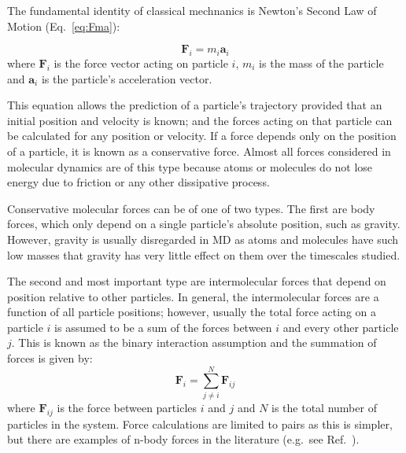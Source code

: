 \documentclass[12pt]{UoAthesis} \usepackage{booktabs}
\begin{document}
The fundamental identity of classical mechnanics is Newton's Second
Law of Motion (Eq.~\eqref{eq:Fma}):

\begin{equation}
  \mathbf{F}_i = m_i\mathbf{a}_i
  \label{eq:Fma} 
\end{equation}
%
%
%
where $\mathbf{F}_i$ is the force vector acting on particle $i$, $m_i$
is the mass of the particle and $\mathbf{a}_i$ is the particle's
acceleration vector.

This equation allows the prediction of a particle's trajectory
provided that an initial position and velocity is known; and the
forces acting on that particle can be calculated for any position or
velocity.  If a force depends only on the position of a particle, it
is known as a conservative force. Almost all forces considered in
molecular dynamics are of this type because atoms or molecules do not
lose energy due to friction or any other dissipative process.

Conservative molecular forces can be of one of two types.  The first
are body forces, which only depend on a single particle's absolute
position, such as gravity.  However, gravity is usually disregarded in
MD as atoms and molecules have such low masses that gravity has very
little effect on them over the timescales studied.

The second and most important type are intermolecular forces that
depend on position relative to other particles. In general, the
intermolecular forces are a function of all particle positions;
however, usually the total force acting on a particle $i$ is assumed
to be a sum of the forces between $i$ and every other particle
$j$. This is known as the binary interaction assumption and the
summation of forces is given by:
\begin{equation}
  \mathbf{F}_i = \sum_{j \not= i}^{N}\mathbf{F}_{ij}
  \label{eq:pairwise}
\end{equation}
%
where $\mathbf{F}_{ij}$ is the force between particles $i$ and $j$ and
$N$ is the total number of particles in the system.  Force
calculations are limited to pairs as this is simpler, but there are
examples of n-body forces in the literature (e.g.\ see
Ref.~\cite{Tersoff1988}).
\end{document}
